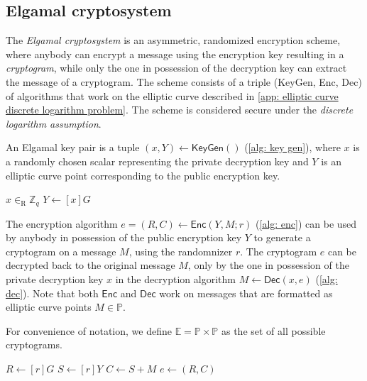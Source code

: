 \subsection{Elgamal cryptosystem} \label{app: elgamal cryptosystem}
The \textit{Elgamal cryptosystem} is an asymmetric, randomized encryption scheme, where anybody can encrypt a message using the encryption key resulting in a \textit{cryptogram}, while only the one in possession of the decryption key can extract the message of a cryptogram. The scheme consists of a triple (\textsf{KeyGen}, \textsf{Enc}, \textsf{Dec}) of algorithms that work on the elliptic curve described in \cref{app: elliptic curve discrete logarithm problem}. The scheme is considered secure under the \textit{discrete logarithm assumption}.

An Elgamal key pair is a tuple $(x, Y) \gets \mathsf{KeyGen}()$ (\cref{alg: key gen}), where $x$ is a randomly chosen scalar representing the private decryption key and $Y$ is an elliptic curve point corresponding to the public encryption key.

\begin{algorithm}[ht]
    \DontPrintSemicolon
    \caption{$\mathsf{KeyGen}()$}
    
    $x \in_\mathrm{R} \mathbb{Z}_q$ \;
    $Y \gets [x]G$ \;
     
    
    \label{alg: key gen}
\end{algorithm}

The encryption algorithm $e = (R, C) \gets \mathsf{Enc} (Y, M; r)$ (\cref{alg: enc}) can be used by anybody in possession of the public encryption key $Y$ to generate a cryptogram on a message $M$, using the randomnizer $r$. The cryptogram $e$ can be decrypted back to the original message $M$, only by the one in possession of the private decryption key $x$ in the decryption algorithm $M \gets \mathsf{Dec} (x, e)$ (\cref{alg: dec}). Note that both $\mathsf{Enc}$ and $\mathsf{Dec}$ work on messages that are formatted as elliptic curve points $M \in \mathbb{P}$.

For convenience of notation, we define $\mathbb{E} = \mathbb{P} \times \mathbb{P}$ as the set of all possible cryptograms.

\begin{algorithm}[ht]
    \DontPrintSemicolon
    \caption{$\mathsf{Enc} (Y, M; r)$}
    
    $R \gets [r]G$ \;
    $S \gets [r]Y$ \;
    $C \gets S + M$ \;
    $e \gets (R, C)$ \;
     
    
    \label{alg: enc}
\end{algorithm}

